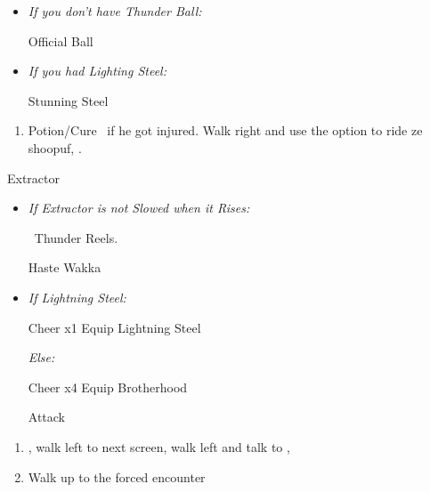 \begin{equip}
    \begin{itemize}
        \item \textit{If you don't have Thunder Ball:}
        \begin{itemize}
            \wakkaf Official Ball
        \end{itemize}
        \item \textit{If you had Lighting Steel:}
        \begin{itemize}
            \tidusf Stunning Steel
        \end{itemize}
    \end{itemize}
\end{equip}
\begin{enumerate}[resume]
    \item Potion/Cure \tidus\ if he got injured. Walk right and use the  option to ride ze shoopuf, \sd.
\end{enumerate}
\winvfill\lossvfill
\begin{battle}[4000]{Extractor}
    \begin{itemize}
        \tidusf Haste self
        \wakkaf If anyone is below 216 HP Hi-Potion them, otherwise Attack
        \tidusf Attack Extractor until you apply Slow
        \item \textit{If Extractor is not Slowed when it Rises:}
        \begin{itemize}
            \wakkaf \od\ Thunder Reels.
        \end{itemize}
        \tidusf Haste Wakka
        \item \textit{If Lightning Steel:}
        \begin{itemize}
            \tidusf Cheer x1
            \tidusf Equip Lightning Steel
        \end{itemize}
        \textit{Else:}
        \begin{itemize}
            \tidusf Cheer x4
            \tidusf Equip Brotherhood
        \end{itemize}
        \tidusf Attack
    \end{itemize}
\end{battle}
\begin{enumerate}[resume]
    \item \sd, walk left to next screen, walk left and talk to \rikku, \sd
    \item Walk up to the forced encounter
\end{enumerate}
